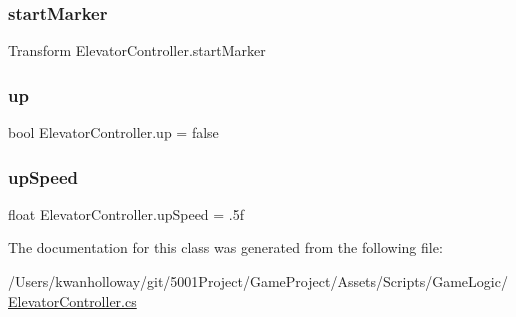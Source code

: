 \subsubsection{\texorpdfstring{start\+Marker}{startMarker}}
{\footnotesize\ttfamily Transform Elevator\+Controller.\+start\+Marker}

\mbox{\label{class_elevator_controller_aff0b538f1ab6bf0759c7fde9fcc1fb38}} 
\subsubsection{\texorpdfstring{up}{up}}
{\footnotesize\ttfamily bool Elevator\+Controller.\+up = false}

\mbox{\label{class_elevator_controller_a9a5b319532f7be14eeee9d45cf21f695}} 
\subsubsection{\texorpdfstring{up\+Speed}{upSpeed}}
{\footnotesize\ttfamily float Elevator\+Controller.\+up\+Speed = .\+5f}



The documentation for this class was generated from the following file\+:\begin{DoxyCompactItemize}
\item 
/\+Users/kwanholloway/git/5001\+Project/\+Game\+Project/\+Assets/\+Scripts/\+Game\+Logic/\hyperlink{_elevator_controller_8cs}{Elevator\+Controller.\+cs}\end{DoxyCompactItemize}
